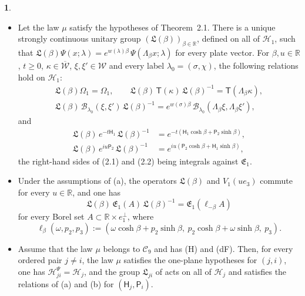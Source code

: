 \documentclass[11pt]{amsart}
\newcommand{\namedhead}{}
\theoremstyle{definition}
\newtheorem*{namedinner}{\namedhead}
\newenvironment{named}[1]{\renewcommand{\namedhead}{#1}\begin{namedinner}}{\end{namedinner}}
\begin{document}
\begin{named}{Corollary 2.2}
\begin{itemize}
\item[(a)] Let the law $\mu$ satisfy the hypotheses of Theorem~2.1.
There is a unique strongly continuous unitary group $(\mathfrak L(\beta))_{\beta\in\mathbb R}$, defined on all of $\mathcal H_1$, such that $\mathfrak L(\beta)\Psi(x;\lambda)=\allowbreak e^{w(\lambda)\beta}\,\allowbreak \Psi(\Lambda_\beta x;\lambda)$ for every plate vector.
For $\beta,u\in\mathbb R$, $t\ge0$, $\kappa\in\overline{\mathcal W}$, $\xi,\xi'\in\mathcal W$ and every label $\lambda_0=(\sigma,\chi)$, the following relations hold on $\mathcal H_1$:
\begin{gather*}
\mathfrak L(\beta)\Omega_1=\Omega_1,\qquad\mathfrak L(\beta)\,\mathsf T(\kappa)\,\mathfrak L(\beta)^{-1}=\mathsf T(\Lambda_\beta\kappa),\\
\mathfrak L(\beta)\,\mathcal B_{\lambda_0}(\xi,\xi')\,\mathfrak L(\beta)^{-1}=e^{w(\sigma)\beta}\,\mathcal B_{\lambda_0}(\Lambda_\beta\xi,\Lambda_\beta\xi'),
\end{gather*}
and
\begin{align}
\mathfrak L(\beta)\,e^{-t\mathsf H_1}\,\mathfrak L(\beta)^{-1}&=e^{-t(\mathsf H_1\cosh\beta+\mathsf P_2\sinh\beta)},\tag{2.1}\\
\mathfrak L(\beta)\,e^{iu\mathsf P_2}\,\mathfrak L(\beta)^{-1}&=e^{iu(\mathsf P_2\cosh\beta+\mathsf H_1\sinh\beta)},\tag{2.2}
\end{align}
the right-hand sides of (2.1) and (2.2) being integrals against $\mathfrak E_1$.
\item[(b)] Under the assumptions of (a), the operators $\mathfrak L(\beta)$ and $V_1(ue_3)$ commute for every $u\in\mathbb R$, and one has
\begin{equation*}
\mathfrak L(\beta)\,\mathfrak E_1(A)\,\mathfrak L(\beta)^{-1}=\mathfrak E_1(\ell_{-\beta}A)
\end{equation*}
for every Borel set $A\subset\mathbb R\times e_1^\perp$, where
\begin{equation*}
\ell_\beta(\omega,p_2,p_3):=(\omega\cosh\beta+p_2\sinh\beta,\ p_2\cosh\beta+\omega\sinh\beta,\ p_3).
\end{equation*}
\item[(c)] Assume that the law $\mu$ belongs to $\mathcal C_9$ and has (H) and (dF).
Then, for every ordered pair $j\ne i$, the law $\mu$ satisfies the one-plane hypotheses for $(j,i)$, one has $\mathcal H^{\Psi}_{ji}=\mathcal H_j$, and the group $\mathfrak L_{ji}$ of \cite[Theorem~1.4, Part~I\,(c)]{QEDII} acts on all of $\mathcal H_j$ and satisfies the relations of (a) and (b) for $(\mathsf H_j,\mathsf P_i)$.

\end{itemize}
\end{named}
\end{document}
